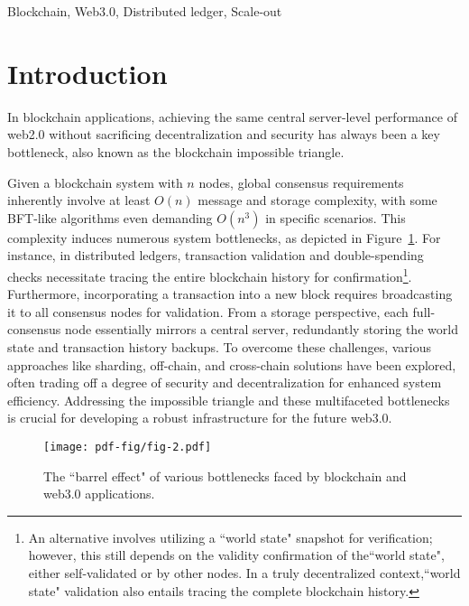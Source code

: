 \documentclass[conference]{IEEEtran}
\begin{document}
\begin{IEEEkeywords}
Blockchain, Web3.0, Distributed ledger, Scale-out
\end{IEEEkeywords}

\section{Introduction}
In blockchain applications, achieving the same central server-level performance of web2.0 without sacrificing decentralization and security has always been a key bottleneck, also known as the blockchain impossible triangle.

Given a blockchain system with $n$ nodes, global consensus requirements inherently involve at least \(O(n)\) message and storage complexity, with some BFT-like algorithms even demanding \(O(n^3)\) in specific scenarios. This complexity induces numerous system bottlenecks,  as depicted in Figure~\ref{fig:barrel effect}. For instance, in distributed ledgers, transaction validation and double-spending checks necessitate tracing the entire blockchain history for confirmation\footnote{An alternative involves utilizing a ``world state" snapshot for verification; however, this still depends on the validity confirmation of the``world state", either self-validated or by other nodes. In a truly decentralized context,``world state" validation also entails tracing the complete blockchain history.}. Furthermore, incorporating a transaction into a new block requires broadcasting it to all consensus nodes for validation. From a storage perspective, each full-consensus node essentially mirrors a central server, redundantly storing the world state and transaction history backups. To overcome these challenges, various approaches like sharding, off-chain, and cross-chain solutions have been explored, often trading off a degree of security and decentralization for enhanced system efficiency. Addressing the impossible triangle and these multifaceted bottlenecks is crucial for developing a robust infrastructure for the future web3.0.

\begin{figure}[htp!]
    \centering
    \texttt{[image: pdf-fig/fig-2.pdf]}
    \caption{The ``barrel effect" of various bottlenecks faced by blockchain and web3.0 applications.}
    \label{fig:barrel effect}
\end{figure}
\end{document}
